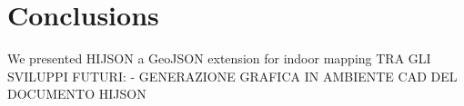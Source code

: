 \documentclass{sig-alternate}
\begin{document}
\section{Conclusions}\label{conclusions}

We presented HIJSON a GeoJSON extension for indoor mapping TRA GLI
SVILUPPI FUTURI: - GENERAZIONE GRAFICA IN AMBIENTE CAD DEL DOCUMENTO
HIJSON

%

%
%
\end{document}
